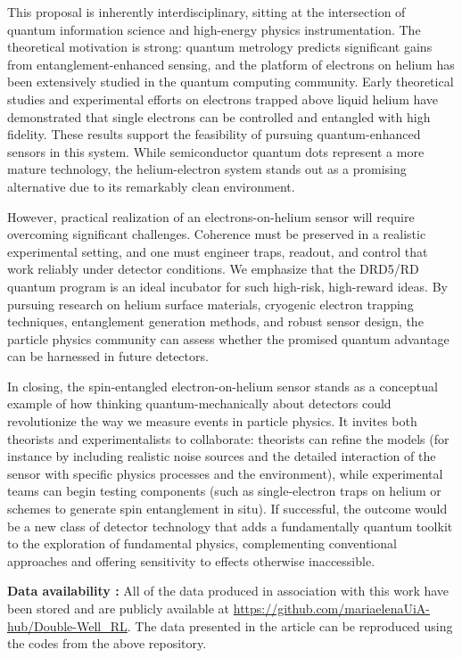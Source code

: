\documentclass[fleqn,10pt]{wlscirep}
\begin{document}
This proposal is inherently interdisciplinary, sitting at the intersection of quantum information science and high-energy physics instrumentation. The theoretical motivation is strong: quantum metrology predicts significant gains from entanglement-enhanced sensing, and the platform of electrons on helium has been extensively studied in the quantum computing community. Early theoretical studies and experimental efforts on electrons trapped above liquid helium have demonstrated that single electrons can be controlled and entangled with high fidelity. These results support the feasibility of pursuing quantum-enhanced sensors in this system. While semiconductor quantum dots represent a more mature technology, the helium-electron system stands out as a promising alternative due to its remarkably clean environment.

However, practical realization of an electrons-on-helium sensor will require overcoming significant challenges. Coherence must be preserved in a realistic experimental setting, and one must engineer traps, readout, and control that work reliably under detector conditions. We emphasize that the DRD5/RD quantum program \cite{drd52024} is an ideal incubator for such high-risk, high-reward ideas. By pursuing research on helium surface materials, cryogenic electron trapping techniques, entanglement generation methods, and robust sensor design, the particle physics community can assess whether the promised quantum advantage can be harnessed in future detectors.

In closing, the spin-entangled electron-on-helium sensor stands as a conceptual example of how thinking quantum-mechanically about detectors could revolutionize the way we measure events in particle physics. It invites both theorists and experimentalists to collaborate: theorists can refine the models (for instance by including realistic noise sources and the detailed interaction of the sensor with specific physics processes and the environment), while experimental teams can begin testing components (such as single-electron traps on helium or schemes to generate spin entanglement in situ). If successful, the outcome would be a new class of detector technology that adds a fundamentally quantum toolkit to the exploration of fundamental physics, complementing conventional approaches and offering sensitivity to effects otherwise inaccessible. 




\medskip
\noindent \textbf{Data availability :}
All of the data produced in association with this work have been stored and are publicly available  at \url{https://github.com/mariaelenaUiA-hub/Double-Well_RL}. The data presented in the article can be reproduced using the codes from the above repository. 
\end{document}

